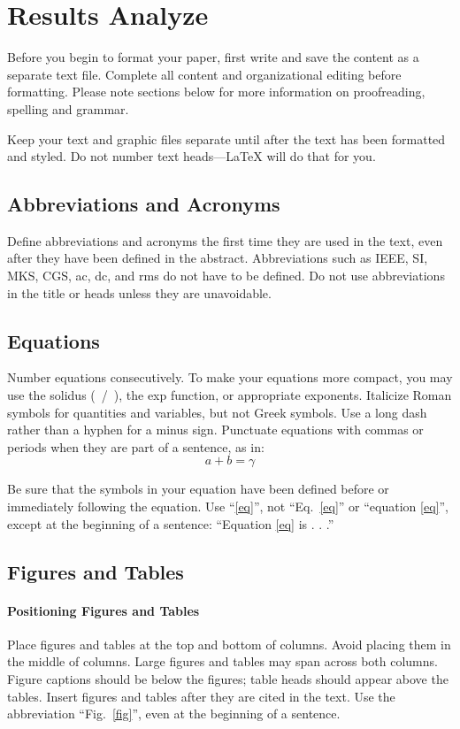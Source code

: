 \documentclass[conference]{IEEEtran}
\begin{document}
\section{Results Analyze}
Before you begin to format your paper, first write and save the content as a 
separate text file. Complete all content and organizational editing before 
formatting. Please note sections below for more information on 
proofreading, spelling and grammar.

Keep your text and graphic files separate until after the text has been 
formatted and styled. Do not number text heads---{\LaTeX} will do that 
for you.

\subsection{Abbreviations and Acronyms}\label{AA}
Define abbreviations and acronyms the first time they are used in the text, 
even after they have been defined in the abstract. Abbreviations such as 
IEEE, SI, MKS, CGS, ac, dc, and rms do not have to be defined. Do not use 
abbreviations in the title or heads unless they are unavoidable.

\subsection{Equations}
Number equations consecutively. To make your 
equations more compact, you may use the solidus (~/~), the exp function, or 
appropriate exponents. Italicize Roman symbols for quantities and variables, 
but not Greek symbols. Use a long dash rather than a hyphen for a minus 
sign. Punctuate equations with commas or periods when they are part of a 
sentence, as in:
\begin{equation}
a+b=\gamma\label{eq}
\end{equation}

Be sure that the 
symbols in your equation have been defined before or immediately following 
the equation. Use ``\eqref{eq}'', not ``Eq.~\eqref{eq}'' or ``equation \eqref{eq}'', except at 
the beginning of a sentence: ``Equation \eqref{eq} is . . .''

\subsection{Figures and Tables}
\paragraph{Positioning Figures and Tables} Place figures and tables at the top and 
bottom of columns. Avoid placing them in the middle of columns. Large 
figures and tables may span across both columns. Figure captions should be 
below the figures; table heads should appear above the tables. Insert 
figures and tables after they are cited in the text. Use the abbreviation 
``Fig.~\ref{fig}'', even at the beginning of a sentence.
\end{document}
